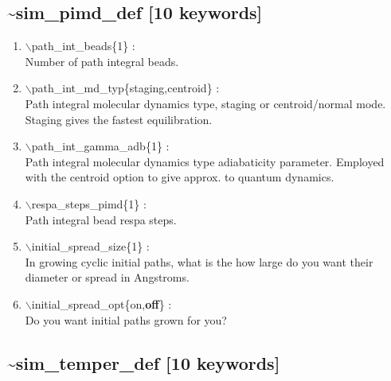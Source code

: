 \documentclass[12pt]{article}
\begin{document}
\newpage
\subsection*{\bf \~{}sim\_pimd\_def [10 keywords]}

\begin{enumerate}

 \vspace{0.15in} 
 \item  $\backslash$path\_int\_beads\{1\} : \\
     Number of path integral beads.

 \vspace{0.15in} 
 \item  $\backslash$path\_int\_md\_typ\{staging,centroid\} : \\
     Path integral molecular dynamics type, staging or centroid/normal mode.
     Staging gives the fastest equilibration.

 \vspace{0.15in} 
 \item  $\backslash$path\_int\_gamma\_adb\{1\} : \\
     Path integral molecular dynamics type adiabaticity parameter.
     Employed with the centroid option to give approx. to quantum dynamics.

 \vspace{0.15in} 
 \item  $\backslash$respa\_steps\_pimd\{1\} : \\
     Path integral bead respa steps.

 \vspace{0.15in} 
 \item  $\backslash$initial\_spread\_size\{1\} : \\
    In growing cyclic initial paths, what is the how large do you
    want their diameter or spread in Angstroms.

 \vspace{0.15in} 
 \item  $\backslash$initial\_spread\_opt\{on,{\bf off}\} : \\
    Do you want initial paths grown for you?

\end{enumerate}

\newpage
\newpage
\subsection*{\bf \~{}sim\_temper\_def [10 keywords]}
\end{document}
